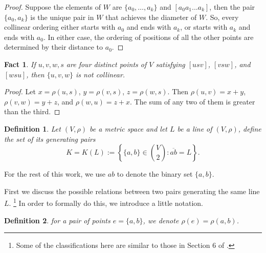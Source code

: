 \documentclass[12pt]{article}
\newcommand{\ov}{\overline}
\newtheorem{fact}{Fact}
\newtheorem{defi}{Definition}
\begin{document}
\begin{proof}
Suppose the elements of $W$ are $\{a_0, \dots, a_k\}$
and $[a_0 a_1 ... a_k]$,
then the pair $\{a_0, a_k\}$ is the unique pair in $W$ that achieves the diameter of $W$.
So, every collinear ordering either starts with $a_0$ and ends with $a_k$,
or starts with $a_k$ and ends with $a_0$. In either case, 
the ordering of positions of all the other points are determined by their distance to $a_0$.
\end{proof}

\begin{fact}\label{fact.star}
If $u, v, w, s$ are four distinct points of $V$ satisfying
$[usv]$, $[vsw]$, and $[wsu]$, then $\{u, v, w\}$ is not collinear.
\end{fact}

\begin{proof}
Let $x = \rho(u, s)$, $y = \rho(v, s)$, $z = \rho(w, s)$.
Then $\rho(u, v) = x+y$, $\rho(v, w) = y+z$, and $\rho(w, u) = z+x$.
The sum of any two of them is greater than the third. 
\end{proof}

\begin{defi}
Let $(V, \rho)$ be a metric space and let $L$ be a line of $(V, \rho)$,
define the set of its {\em generating pairs}
\begin{equation}\label{eq.def_generator_pairs}
K = K(L) := \left\{ \{a, b\} \in \binom{V}{2} : \ov{ab} = L \right\}.
\end{equation}
\end{defi}

For the rest of this work, we use $ab$ to denote the binary set $\{a, b\}$.

First we discuss the possible relations between two pairs generating the same line $L$.
\footnote{Some of the classifications here are similar to those in Section 6 of \cite{ACHKS}.}
In order to formally do this, we introduce a little notation.

\begin{defi}
for a pair of points $e = \{a, b\}$, we denote $\rho(e) = \rho(a, b)$.
\end{defi}
\end{document}
